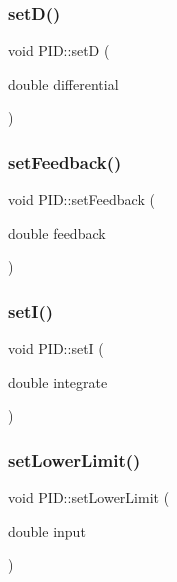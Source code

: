 \mbox{\label{classPID_a28242935e76099bb3f7dadca5d637bf2}} 
\subsubsection{\texorpdfstring{set\+D()}{setD()}}
{\footnotesize\ttfamily void P\+I\+D\+::setD (\begin{DoxyParamCaption}\item[{double}]{differential }\end{DoxyParamCaption})}

\mbox{\label{classPID_ae39d79cca4984d655496a732653f24b8}} 
\subsubsection{\texorpdfstring{set\+Feedback()}{setFeedback()}}
{\footnotesize\ttfamily void P\+I\+D\+::set\+Feedback (\begin{DoxyParamCaption}\item[{double}]{feedback }\end{DoxyParamCaption})}

\mbox{\label{classPID_adbeb511ef92e869224d56203164e7c21}} 
\subsubsection{\texorpdfstring{set\+I()}{setI()}}
{\footnotesize\ttfamily void P\+I\+D\+::setI (\begin{DoxyParamCaption}\item[{double}]{integrate }\end{DoxyParamCaption})}

\mbox{\label{classPID_af08ab0140dca0984fac5be716e806e75}} 
\subsubsection{\texorpdfstring{set\+Lower\+Limit()}{setLowerLimit()}}
{\footnotesize\ttfamily void P\+I\+D\+::set\+Lower\+Limit (\begin{DoxyParamCaption}\item[{double}]{input }\end{DoxyParamCaption})}

